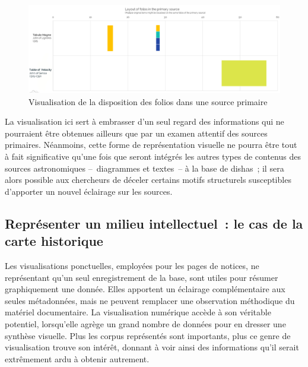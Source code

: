 \documentclass[a4paper,12pt,twoside]{book}
\newcommand{\dishas}{\gls{dishas}\xspace}
\begin{document}
\begin{figure}[H]
	\centering
	\includegraphics[width=16cm]{Images/Visualisations/Primary_source-Spread_out.png}
	\caption{Visualisation de la disposition des folios dans une source primaire}
\end{figure}

La visualisation ici sert à embrasser d'un seul regard des informations qui ne pourraient être obtenues ailleurs que par un examen attentif des sources primaires. Néanmoins, cette forme de représentation visuelle ne pourra être tout à fait significative qu'une fois que seront intégrés les autres types de contenus des sources astronomiques –~diagrammes et textes~– à la base de \dishas~; il sera alors possible aux chercheurs de déceler certains motifs structurels susceptibles d'apporter un nouvel éclairage sur les sources.

		\subsection{Représenter un milieu intellectuel~: le cas de la carte historique\label{HistoricalMap}}
Les visualisations ponctuelles, employées pour les pages de notices, ne représentant qu'un seul enregistrement de la base, sont utiles pour résumer graphiquement une donnée. Elles apportent un éclairage complémentaire aux seules métadonnées, mais ne peuvent remplacer une observation méthodique du matériel documentaire. La visualisation numérique accède à son véritable potentiel, lorsqu'elle agrège un grand nombre de données pour en dresser une synthèse visuelle. Plus les corpus représentés sont importants, plus ce genre de visualisation trouve son intérêt, donnant à voir ainsi des informations qu'il serait extrêmement ardu à obtenir autrement.
\end{document}
